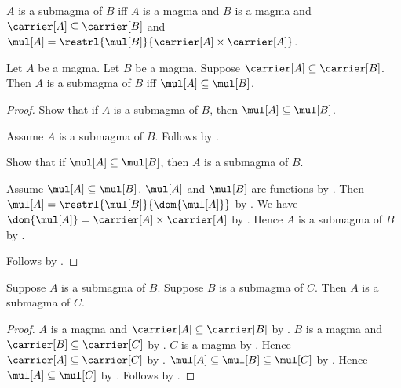 \begin{definition}\label{submagma}
    $A$ is a submagma of $B$ iff
        $A$ is a magma and
        $B$ is a magma and
        $\carrier[A]\subseteq \carrier[B]$ and
        $\mul[A]
            = \restrl{\mul[B]}{\carrier[A]\times\carrier[A]}$.
\end{definition}

\begin{proposition}\label{submagma_iff_mul_subseteq}
    Let $A$ be a magma.
    Let $B$ be a magma.
    Suppose $\carrier[A]\subseteq\carrier[B]$.
    Then $A$ is a submagma of $B$ iff $\mul[A]\subseteq\mul[B]$.
\end{proposition}
\begin{proof}
    Show that if $A$ is a submagma of $B$, then
        $\mul[A]\subseteq\mul[B]$.
    \begin{subproof}
        Assume $A$ is a submagma of $B$.
        Follows by .
    \end{subproof}

    Show that if $\mul[A]\subseteq\mul[B]$, then
        $A$ is a submagma of $B$.
    \begin{subproof}
        Assume $\mul[A]\subseteq\mul[B]$.
        $\mul[A]$ and $\mul[B]$ are functions
            by .
        Then $\mul[A]=\restrl{\mul[B]}{\dom{\mul[A]}}$
            by .
        We have $\dom{\mul[A]}=\carrier[A]\times\carrier[A]$
            by .
        Hence $A$ is a submagma of $B$ by .
    \end{subproof}
    Follows by \auto.
\end{proof}

\begin{proposition}\label{submagma_transitive}
    Suppose $A$ is a submagma of $B$.
    Suppose $B$ is a submagma of $C$.
    Then $A$ is a submagma of $C$.
\end{proposition}
\begin{proof}
    $A$ is a magma and $\carrier[A]\subseteq\carrier[B]$
        by .
    $B$ is a magma and $\carrier[B]\subseteq\carrier[C]$
        by .
    $C$ is a magma by .
    Hence $\carrier[A]\subseteq\carrier[C]$
        by .
    $\mul[A]\subseteq\mul[B]\subseteq\mul[C]$
        by .
    Hence $\mul[A]\subseteq\mul[C]$
        by .
    Follows by .
\end{proof}

